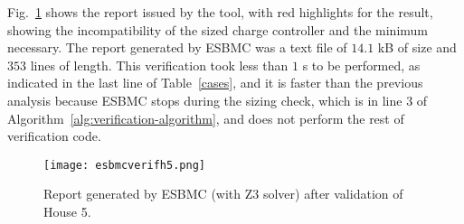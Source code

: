 Fig.~\ref{fig:esbmcverifhouse5} shows the report issued by the tool, with red highlights for the result, showing the incompatibility of the sized charge controller and the minimum necessary. The report generated by ESBMC was a text file of $14.1$ kB of size and $353$ lines of length. This verification took less than $1$ s to be performed, as indicated in the last line of Table~\ref{cases}, and it is faster than the previous analysis because ESBMC stops during the sizing check, which is in line $3$ of Algorithm~\ref{alg:verification-algorithm}, and does not perform the rest of verification code.

\begin{figure}[h]
\texttt{[image: esbmcverifh5.png]}
\centering
\caption{Report generated by ESBMC (with Z3 solver) after validation of House 5.}
\label{fig:esbmcverifhouse5}
\end{figure}

%
%
%

